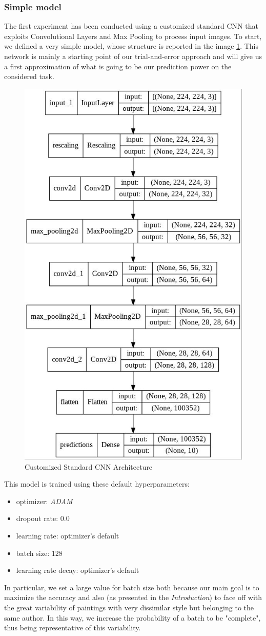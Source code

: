 \subsubsection{Simple model}
The first experiment has been conducted using a customized standard CNN that exploits Convolutional Layers and Max Pooling to process input images. To start, we defined a very simple model, whose structure is reported in the image \ref{fig:standardCNN}. This network is mainly a starting point of our trial-and-error approach and will give us a first approximation of what is going to be our prediction power on the considered task.
\begin{figure}[H]
	\centering
	\includegraphics[height=0.6\textwidth]{img/scratch/standardCNN.jpg}
	\caption{Customized Standard CNN Architecture}
	\label{fig:standardCNN}
\end{figure}

\noindent This model is trained using these default hyperparameters:
\begin{itemize}
\item optimizer: \textit{ADAM}
\item dropout rate: 0.0
\item learning rate: optimizer's default
\item batch size: 128
\item learning rate decay: optimizer's default
\end{itemize}

\noindent In particular, we set a large value for batch size both because our main goal is to maximize the accuracy and also (as presented in the \textit{Introduction}) to face off with the great variability of paintings with very dissimilar style but belonging to the same author. In this way, we increase the probability of a batch to be "complete", thus being representative of this variability.

